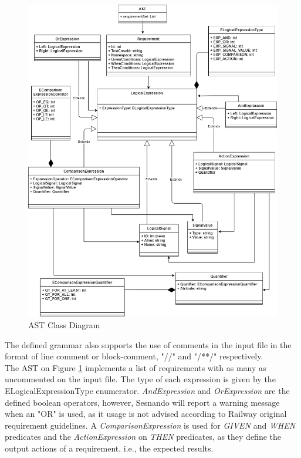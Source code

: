 % 
\begin{figure}[H]
    \centering
    \includegraphics[width=\textwidth]{images/grammar_class_diagram.drawio.png}
    \caption{AST Class Diagram}
    \label{fig:ast_class_diagram}
\end{figure}

The defined grammar also supports the use of comments in the input file in the format of line comment or block-comment, "//" and "/**/" respectively.\\
The AST on Figure \ref{fig:ast_class_diagram} implements a list of requirements with as many as uncommented on the input file. The type of each expression is given by the ELogicalExpressionType enumerator. \textit{AndExpression} and \textit{OrExpression} are the defined boolean operators, however, Sesnando will report a warning message when an "OR" is used, as it usage is not advised according to Railway original requirement guidelines. A \textit{ComparisonExpression} is used for \textit{GIVEN} and \textit{WHEN} predicates and the \textit{ActionExpression} on \textit{THEN} predicates, as they define the output actions of a requirement, i.e., the expected results.


